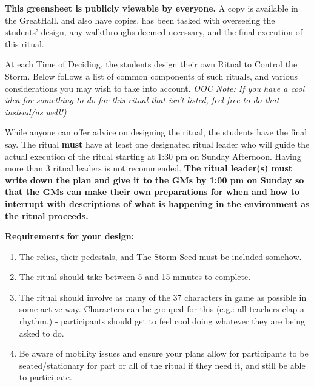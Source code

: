 \documentclass[green]{GL2020}
\begin{document}
\name{\gRitualControlStorm{}}
\textbf{This greensheet is publicly viewable by everyone.} A copy is available in the GreatHall. \cPrincipal{\full} and \cChupSecond{\full} also have copies. \cChupSecond{} has been tasked with overseeing the students' design, any walkthroughs deemed necessary, and the final execution of this ritual. 

At each Time of Deciding, the students design their own Ritual to Control the Storm. Below follows a list of common components of such rituals, and various considerations you may wish to take into account. \emph{OOC Note: If you have a cool idea for something to do for this ritual that isn’t listed, feel free to do that instead/as well!)}

While anyone can offer advice on designing the ritual, the students have the final say. The ritual \textbf{must} have at least one designated ritual leader who will guide the actual execution of the ritual starting at 1:30 pm on Sunday Afternoon. Having more than 3 ritual leaders is not recommended. \textbf{The ritual leader(s) must write down the plan and give it to the GMs by 1:00 pm on Sunday so that the GMs can make their own preparations for when and how to interrupt with descriptions of what is happening in the environment as the ritual proceeds.}

\textbf{Requirements for your design:}
\begin{enumerate}
  \item The relics, their pedestals, and The Storm Seed must be included somehow.
  \item The ritual should take between 5 and 15 minutes to complete.
  \item The ritual should involve as many of the 37 characters in game as possible in some active way. Characters can be grouped for this (e.g.: all teachers clap a rhythm.) - participants should get to feel cool doing whatever they are being asked to do.
  \item Be aware of mobility issues and ensure your plans allow for participants to be seated/stationary for part or all of the ritual if they need it, and still be able to participate.
\end{enumerate}
\end{document}
